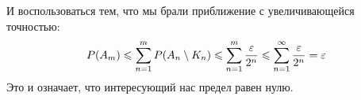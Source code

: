 \begin{solution}
\begin{enumerate}
        И воспользоваться тем, что мы брали приближение с увеличивающейся точностью:
        \[
            P(A_m) \leqslant \sum_{n=1}^m P(A_n \setminus K_n) \leqslant \sum_{n=1}^m \frac{\varepsilon}{2^n} \leqslant \sum_{n=1}^\infty \frac{\varepsilon}{2^n} = \varepsilon
        \]
        Это и означает, что интересующий нас предел равен нулю.
    \end{enumerate}
\end{solution}